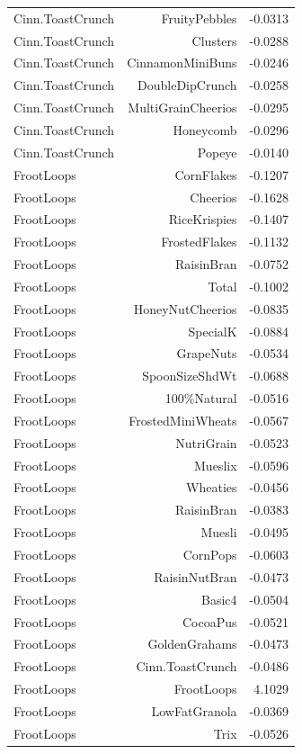 \begin{longtable}{@{}lrr@{}}
Cinn.ToastCrunch & FruityPebbles & -0.0313 \\
Cinn.ToastCrunch & Clusters & -0.0288 \\
Cinn.ToastCrunch & CinnamonMiniBuns & -0.0246 \\
Cinn.ToastCrunch & DoubleDipCrunch & -0.0258 \\
Cinn.ToastCrunch & MultiGrainCheerios & -0.0295 \\
Cinn.ToastCrunch & Honeycomb & -0.0296 \\
Cinn.ToastCrunch & Popeye & -0.0140 \\
FrootLoops & CornFlakes & -0.1207 \\
FrootLoops & Cheerios & -0.1628 \\
FrootLoops & RiceKrispies & -0.1407 \\
FrootLoops & FrostedFlakes & -0.1132 \\
FrootLoops & RaisinBran & -0.0752 \\
FrootLoops & Total & -0.1002 \\
FrootLoops & HoneyNutCheerios & -0.0835 \\
FrootLoops & SpecialK & -0.0884 \\
FrootLoops & GrapeNuts & -0.0534 \\
FrootLoops & SpoonSizeShdWt & -0.0688 \\
FrootLoops & 100\%Natural & -0.0516 \\
FrootLoops & FrostedMiniWheats & -0.0567 \\
FrootLoops & NutriGrain & -0.0523 \\
FrootLoops & Mueslix & -0.0596 \\
FrootLoops & Wheaties & -0.0456 \\
FrootLoops & RaisinBran & -0.0383 \\
FrootLoops & Muesli & -0.0495 \\
FrootLoops & CornPops & -0.0603 \\
FrootLoops & RaisinNutBran & -0.0473 \\
FrootLoops & Basic4 & -0.0504 \\
FrootLoops & CocoaPus & -0.0521 \\
FrootLoops & GoldenGrahams & -0.0473 \\
FrootLoops & Cinn.ToastCrunch & -0.0486 \\
FrootLoops & FrootLoops & 4.1029 \\
FrootLoops & LowFatGranola & -0.0369 \\
FrootLoops & Trix & -0.0526 \\

\end{longtable}
